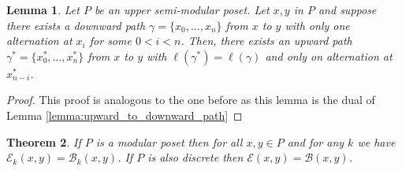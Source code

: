 \documentclass{article}[12pt]
\theoremstyle{exampstyle}
\newtheorem{theorem}{Theorem}[section]
\newtheorem{lemma}[theorem]{Lemma}
\theoremstyle{remark}
\newcommand{\B}{\mathcal{B}}
\newcommand{\E}{\mathcal{E}}
\newcommand{\tuple}[3][1]{#2_{#1}, \dots , #2_{#3}}
\begin{document}
\begin{lemma}
   Let $P$ be an upper semi-modular poset. Let $x,y$ in $P$ and suppose there exists a downward path $\gamma = \{\tuple[0]{x}{n}\}$ from $x$ to $y$ with only one alternation at $x_i$ for some $0 <i < n$. Then, there exists an upward path $\gamma^*= \{\tuple[0]{x^*}{n}\}$ from  $x$ to $y$ with $\ell(\gamma^*) = \ell(\gamma)$ and only on alternation at $x^*_{n-i}$. 
    \label{lemma:downward_to_upward_path}
\end{lemma}
\begin{proof}
    This proof is analogous to the one before as this lemma is the dual of Lemma \ref{lemma:upward_to_downward_path} 
\end{proof}

\begin{theorem}
    If $P$ is a modular poset then for all $x,y \in P$ and for any $k$ we have $\E_k(x,y) = \B_k(x,y)$. If $P$ is also discrete then $\E(x,y) = \B(x,y)$.
    \label{th:E1_B1_equal_modular}
\end{theorem}
\end{document}
